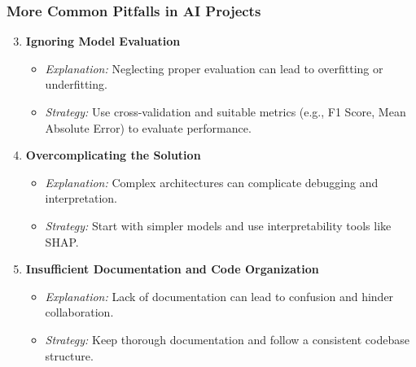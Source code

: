\documentclass[aspectratio=169]{beamer}
\begin{document}
\begin{frame}[fragile]
    \frametitle{More Common Pitfalls in AI Projects}
    \begin{enumerate}
        \setcounter{enumi}{2} %
        \item \textbf{Ignoring Model Evaluation}
            \begin{itemize}
                \item \textit{Explanation:} Neglecting proper evaluation can lead to overfitting or underfitting.
                \item \textit{Strategy:} Use cross-validation and suitable metrics (e.g., F1 Score, Mean Absolute Error) to evaluate performance.
            \end{itemize}
        \item \textbf{Overcomplicating the Solution}
            \begin{itemize}
                \item \textit{Explanation:} Complex architectures can complicate debugging and interpretation.
                \item \textit{Strategy:} Start with simpler models and use interpretability tools like SHAP.
            \end{itemize}
        \item \textbf{Insufficient Documentation and Code Organization}
            \begin{itemize}
                \item \textit{Explanation:} Lack of documentation can lead to confusion and hinder collaboration.
                \item \textit{Strategy:} Keep thorough documentation and follow a consistent codebase structure.
            \end{itemize}
    \end{enumerate}
\end{frame}
\end{document}
